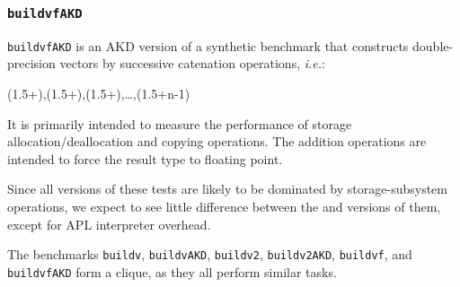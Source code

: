 \subsubsection{\tt buildvfAKD}
\label{benchmarkbuildvfAKD}

{\tt buildvfAKD} is an AKD version of a synthetic benchmark that constructs 
double-precision vectors by successive catenation operations, {\em i.e.}:

 {\apl (1.5+\qiota{}),(1.5+\qiota{}),(1.5+\qiota{}),\dots,(1.5+\qiota\0n-1)}

\noindent It is primarily intended to measure the
performance of storage allocation/deallocation and
copying operations. The addition operations are
intended to force the result type to floating point.

Since all versions of these tests are likely to be dominated
by storage-subsystem operations, we expect to see little
difference between the \dapl and \sac versions of them,
except for APL interpreter overhead.

The benchmarks {\tt buildv}, {\tt buildvAKD}, {\tt buildv2}, {\tt buildv2AKD},
{\tt buildvf}, and {\tt buildvfAKD} form a clique, as they
all perform similar tasks.

